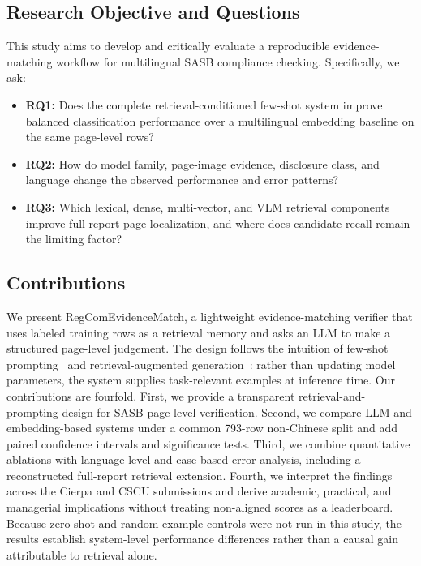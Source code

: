 \documentclass[sigconf,article]{acmart}
\newcommand{\RegComEvidenceMatch}{RegCom\-Evidence\-Match}
\newcommand{\retraug}{retrieval\allowbreak-augmented}
\begin{document}
\subsection{Research Objective and Questions}
This study aims to develop and critically evaluate a reproducible evidence-matching workflow for multilingual SASB compliance checking. Specifically, we ask:

\begin{itemize}
\item \textbf{RQ1:} Does the complete retrieval-conditioned few-shot system improve balanced classification performance over a multilingual embedding baseline on the same page-level rows?
\item \textbf{RQ2:} How do model family, page-image evidence, disclosure class, and language change the observed performance and error patterns?
\item \textbf{RQ3:} Which lexical, dense, multi-vector, and VLM retrieval components improve full-report page localization, and where does candidate recall remain the limiting factor?
\end{itemize}

\subsection{Contributions}
We present \RegComEvidenceMatch{}, a lightweight evidence-matching verifier that uses labeled training rows as a retrieval memory and asks an LLM to make a structured page-level judgement. The design follows the intuition of few-shot prompting~\cite{brown2020language} and \retraug{} generation~\cite{lewis2020retrieval}: rather than updating model parameters, the system supplies task-relevant examples at inference time. Our contributions are fourfold. First, we provide a transparent retrieval-and-prompting design for SASB page-level verification. Second, we compare LLM and embedding-based systems under a common 793-row non-Chinese split and add paired confidence intervals and significance tests. Third, we combine quantitative ablations with language-level and case-based error analysis, including a reconstructed full-report retrieval extension. Fourth, we interpret the findings across the Cierpa and CSCU submissions and derive academic, practical, and managerial implications without treating non-aligned scores as a leaderboard. Because zero-shot and random-example controls were not run in this study, the results establish system-level performance differences rather than a causal gain attributable to retrieval alone.
\end{document}
